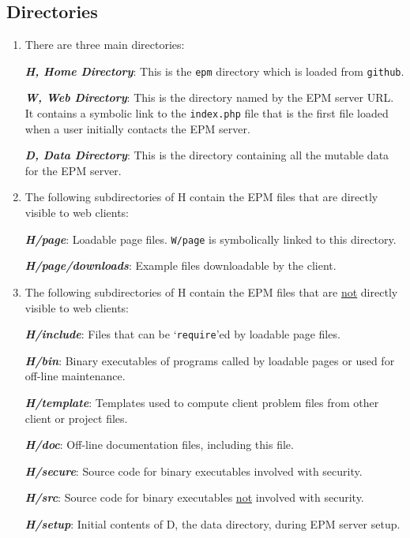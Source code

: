 \documentclass[12pt]{article}
\newcommand{\key}[1]{{\bf \em #1}}
\begin{document}
\subsection{Directories}
\label{DIRECTORIES}

\begin{enumerate}
\item There are three main directories:\label{MAIN-DIRECTORIES}

      \key{H, Home Directory}:\label{H-DIRECTORY}  This is the {\tt epm}
      directory which is loaded from {\tt github}.

      \key{W, Web Directory}\label{W-DIRECTORY}:  This is the directory
      named by the EPM server URL.  It contains a symbolic link to
      the {\tt index.php} file that is
      the first file loaded when a user initially
      contacts the EPM server.

      \key{D, Data Directory}:  This is the directory
      containing all the mutable data for the EPM server.

\item The following subdirectories of H contain the
      EPM files that are directly visible to web clients:

      \key{H/page}:  Loadable page files.  {\tt W/page} is
      symbolically linked to this directory.

      \key{H/page/downloads}:  Example files downloadable
      by the client.

\item The following subdirectories of H contain the
      EPM files that are \underline{not}
      directly visible to web clients:

      \key{H/include}:  Files that can be `{\tt require}'ed by
      loadable page files.

      \key{H/bin}:  Binary executables of programs called by
      loadable pages or used for off-line maintenance.

      \key{H/template}:  Templates used to compute client problem
      files from other client or project files.

      \key{H/doc}:  Off-line documentation files, including this file.

      \key{H/secure}:  Source code for binary executables involved with
      security.

      \key{H/src}:  Source code for binary executables \underline{not}
      involved with security.

      \key{H/setup}:  Initial contents of D, the data directory,
      during EPM server setup.

\end{enumerate}
\end{document}
